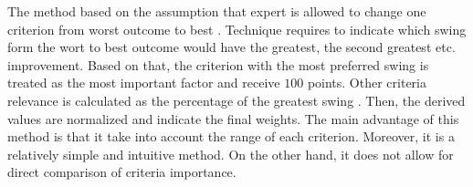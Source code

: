The method based on the assumption that expert is allowed to change one criterion from worst outcome to best \cite{monat2009benefits}. Technique requires to indicate which swing form the wort to best outcome would have the greatest, the second greatest etc. improvement. Based on that, the criterion with the most preferred swing is treated as the most important factor and receive $100$ points. Other criteria relevance is calculated as the percentage of the greatest swing \cite{zardari2015weighting}. Then, the derived values are normalized and indicate the final weights. The main advantage of this method is that it take into account the range of each criterion. Moreover, it is a relatively simple and intuitive method. On the other hand, it does not allow for direct comparison of criteria importance.

